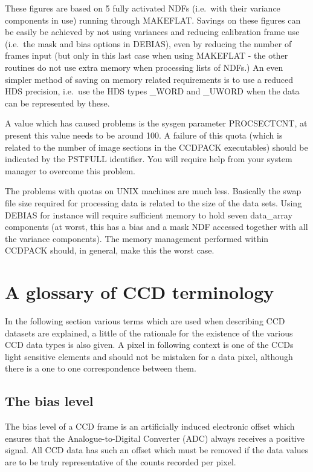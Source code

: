 These figures are based on 5 fully activated NDFs (i.e.\ with their
variance components in use) running through MAKEFLAT.  Savings on these
figures can be easily be achieved by not using variances and reducing
calibration frame use (i.e.\ the mask and bias options in DEBIAS), even
by reducing the number of frames input (but only in this last case when
using MAKEFLAT - the other routines do not use extra memory when
processing lists of NDFs.) An even simpler method of saving on memory
related requirements is to use a reduced HDS precision, i.e.\ use the HDS
types \_WORD and \_UWORD when the data can be represented by these.

A value which has caused problems is the sysgen parameter
PROCSECTCNT, at present this value needs to be around 100. A failure
of this quota (which is related to the number of image sections in the
CCDPACK executables) should be indicated by the PSTFULL identifier. You
will require help from your system manager to overcome this problem.

The problems with quotas on UNIX machines are much less. Basically the
swap file size required for processing data is related to the size of
the data sets. Using DEBIAS for instance will require sufficient memory
to hold seven data\_array components (at worst, this has a bias and a
mask NDF accessed together with all the variance components).
The memory management performed within CCDPACK should, in general,
make this the worst case.

\section{A glossary of CCD terminology}
\label{app:glos}

In the following section various terms which are used when describing CCD
datasets are explained, a little of the rationale for the existence of the
various CCD data types is also given. A pixel in following context is one of the
CCDs light sensitive elements and should not be mistaken for a data pixel,
although there is a one to one correspondence between them.

\subsection{The bias level}

The bias level of a CCD frame is an artificially induced electronic offset
which ensures that the Analogue-to-Digital Converter (ADC) always receives a
positive signal. All CCD data has such an offset which must be removed if the
data values are to be truly representative of the counts recorded per pixel.

